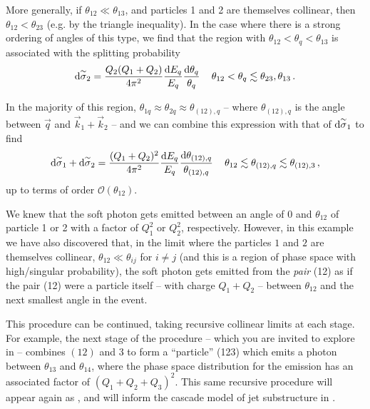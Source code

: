 \begin{example}
    More generally, if \(\theta_{12} \ll \theta_{13}\), and particles 1 and 2 are themselves collinear, then \(\theta_{12} < \theta_{23}\) (e.g. by the triangle inequality).
    In the case where there is a strong ordering of angles of this type, we find that the region with \(\theta_{12} < \theta_q < \theta_{13}\) is associated with the splitting probability
    \begin{align}
        \dd\overset{\sim}{\sigma}_2
        =
        \frac{Q_2(Q_1 + Q_2)}{4\pi^2}
        \frac{\dd E_q}{E_q}
        \frac{\dd\theta_q}{\theta_{q}}
        \,
        &&
        \theta_{12} < \theta_q \lesssim \theta_{23},\theta_{13}
        \,.
    \end{align}

    In the majority of this region, \(\theta_{1q} \approx \theta_{2q} \approx \theta_{(12),q}\) -- where \(\theta_{(12),q}\) is the angle between \(\vec{q}\) and \(\vec{k}_1+\vec{k}_2\) --  and we can combine this expression with that of \(\dd\overset{\sim}{\sigma}_1\) to find
    \begin{align}
        \dd\overset{\sim}{\sigma}_1
        +
        \dd\overset{\sim}{\sigma}_2
        =
        \frac{(Q_1 + Q_2)^2}{4\pi^2}
        \frac{\dd E_q}{E_q}
        \frac{\dd\theta_{(12),q}}{\theta_{(12),q}}
        \,
        &&
        \theta_{12} \lesssim \theta_{(12),q} \lesssim \theta_{(12),3}
        \,,
    \end{align}
    up to terms of order \(\mathcal{O}(\theta_{12})\).

    We knew that the soft photon gets emitted between an angle of \(0\) and \(\theta_{12}\) of particle 1 or 2 with a factor of \(Q_1^2\) or \(Q_2^2\), respectively.
    However, in this example we have also discovered that, in the limit where the particles \(1\) and \(2\) are themselves collinear, \(\theta_{12} \ll \theta_{ij}\) for \(i \neq j\) (and this is a region of phase space with high/singular probability), the soft photon gets emitted from the \emph{pair} (12) as if the pair (12) were a particle itself -- with charge \(Q_1 + Q_2\) -- between \(\theta_{12}\) and the next smallest angle in the event.

    This procedure can be continued, taking recursive collinear limits at each stage.
    For example, the next stage of the procedure -- which you are invited to explore in  -- combines \((12)\) and 3 to form a ``particle'' (123) which emits a photon between \(\theta_{13}\) and \(\theta_{14}\), where the phase space distribution for the emission has an associated factor of \((Q_1 + Q_2 + Q_3)^2\).
    This same recursive procedure will appear again as , and will inform the cascade model of jet substructure in .
\end{example}



